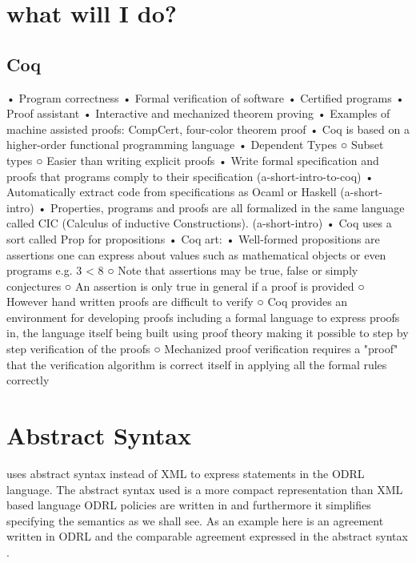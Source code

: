 \section{what will I do?}


\subsection{Coq}


	• Program correctness
	• Formal verification of software
	• Certified programs
	• Proof assistant
	• Interactive and mechanized theorem proving
	• Examples of machine assisted proofs: CompCert, four-color theorem proof
	• Coq is based on a higher-order functional programming language
	• Dependent Types
		○ Subset types
		○ Easier than writing explicit proofs
	• Write formal specification and proofs that programs comply to their specification (a-short-intro-to-coq)
	• Automatically extract code from specifications as Ocaml or Haskell (a-short-intro)
	• Properties, programs and proofs are all formalized in the same language called CIC (Calculus of inductive Constructions). (a-short-intro)
	• Coq uses a sort called Prop for propositions
	• Coq art:
	• Well-formed propositions are assertions  one can express about values such as mathematical objects or even programs e.g. 3 < 8
		○ Note that assertions may be true, false or simply conjectures
		○ An assertion is only true in general if a proof is provided
		○ However hand written proofs are difficult to verify
		○ Coq provides an environment for developing proofs including a formal language to express proofs in, the language itself being built using proof theory making it possible to step by step verification of the proofs
		○ Mechanized proof verification requires a "proof" that the verification algorithm is correct itself in applying all the formal rules correctly







\section{Abstract Syntax}

\cite{pucella2006} uses abstract syntax instead of XML to express statements in the ODRL language. The abstract syntax used is a more compact representation than XML based language ODRL policies are written in and furthermore it simplifies specifying the semantics as we shall see. As an example here is an agreement written in ODRL and the comparable agreement expressed in the abstract syntax \cite{pucella2006}.

